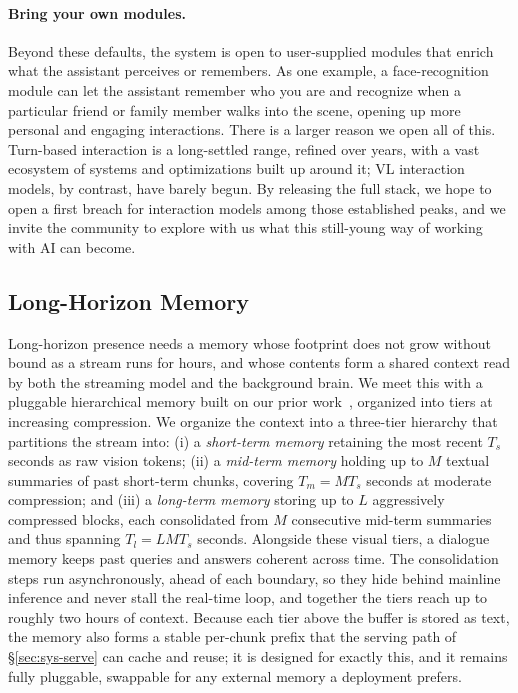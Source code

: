 \documentclass{llmxive}
\begin{document}
\paragraph{\textbf{Bring your own modules.}} Beyond these defaults, the system is open to user-supplied modules that enrich what the assistant perceives or remembers. As one example, a face-recognition module can let the assistant remember who you are and recognize when a particular friend or family member walks into the scene, opening up more personal and engaging interactions. There is a larger reason we open all of this. Turn-based interaction is a long-settled range, refined over years, with a vast ecosystem of systems and optimizations built up around it; VL interaction models, by contrast, have barely begun. By releasing the full stack, we hope to open a first breach for interaction models among those established peaks, and we invite the community to explore with us what this still-young way of working with AI can become.


\subsection{Long-Horizon Memory}\label{sec:sys-mem}
Long-horizon presence needs a memory whose footprint does not grow without bound as a stream runs for hours, and whose contents form a shared context read by both the streaming model and the background brain. We meet this with a pluggable hierarchical memory built on our prior work~\cite{yao2026harnessingstreamingvideowild}, organized into tiers at increasing compression.
We organize the context into a three-tier hierarchy that partitions the stream into: (i) a \textit{short-term memory} retaining the most recent $T_s$ seconds as raw vision tokens; (ii) a \textit{mid-term memory} holding up to $M$ textual summaries of past short-term chunks, covering $T_m = M T_s$ seconds at moderate compression; and (iii) a \textit{long-term memory} storing up to $L$ aggressively compressed blocks, each consolidated from $M$ consecutive mid-term summaries and thus spanning $T_l = L M T_s$ seconds.
Alongside these visual tiers, a dialogue memory keeps past queries and answers coherent across time. The consolidation steps run asynchronously, ahead of each boundary, so they hide behind mainline inference and never stall the real-time loop, and together the tiers reach up to roughly two hours of context. Because each tier above the buffer is stored as text, the memory also forms a stable per-chunk prefix that the serving path of §\ref{sec:sys-serve} can cache and reuse; it is designed for exactly this, and it remains fully pluggable, swappable for any external memory a deployment prefers.
\end{document}
